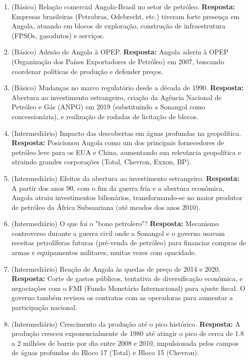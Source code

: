 \documentclass[11pt,a4paper]{article}
\begin{document}
\begin{enumerate}
  \item (Básico) Relação comercial Angola-Brasil no setor de petróleo.
  \textbf{Resposta:} Empresas brasileiras (Petrobras, Odebrecht, etc.) tiveram forte presença em Angola, atuando em blocos de exploração, construção de infraestrutura (FPSOs, gasodutos) e serviços.

  \item (Básico) Adesão de Angola à OPEP.
  \textbf{Resposta:} Angola aderiu à OPEP (Organização dos Países Exportadores de Petróleo) em 2007, buscando coordenar políticas de produção e defender preços.

  \item (Básico) Mudanças no marco regulatório desde a década de 1990.
  \textbf{Resposta:} Abertura ao investimento estrangeiro, criação da Agência Nacional de Petróleo e Gás (ANPG) em 2019 (substituindo a Sonangol como concessionária), e realização de rodadas de licitação de blocos.

  \item (Intermediário) Impacto das descobertas em águas profundas na geopolítica.
  \textbf{Resposta:} Posicionou Angola como um dos principais fornecedores de petróleo leve para os EUA e China, aumentando sua relevância geopolítica e atraindo grandes corporações (Total, Chevron, Exxon, BP).

  \item (Intermediário) Efeitos da abertura ao investimento estrangeiro.
  \textbf{Resposta:} A partir dos anos 90, com o fim da guerra fria e a abertura econômica, Angola atraiu investimentos bilionários, transformando-se no maior produtor de petróleo da África Subsaariana (até meados dos anos 2010).

  \item (Intermediário) O que foi o "bono petrolero"?
  \textbf{Resposta:} Mecanismo controverso durante a guerra civil onde a Sonangol e o governo usavam receitas petrolíferas futuras (pré-venda de petróleo) para financiar compras de armas e equipamentos militares, muitas vezes com opacidade.

  \item (Intermediário) Reação de Angola às quedas de preço de 2014 e 2020.
  \textbf{Resposta:} Corte de gastos públicos, tentativa de diversificação econômica, e negociações com o FMI (Fundo Monetário Internacional) para ajuste fiscal. O governo também revisou os contratos com as operadoras para aumentar a participação nacional.

  \item (Intermediário) Crescimento da produção até o pico histórico.
  \textbf{Resposta:} A produção cresceu exponencialmente de 1980 até atingir o pico de cerca de 1.8 a 2 milhões de barris por dia entre 2008 e 2010, impulsionada pelos campos de águas profundas do Bloco 17 (Total) e Bloco 15 (Chevron).


\end{enumerate}
\end{document}
